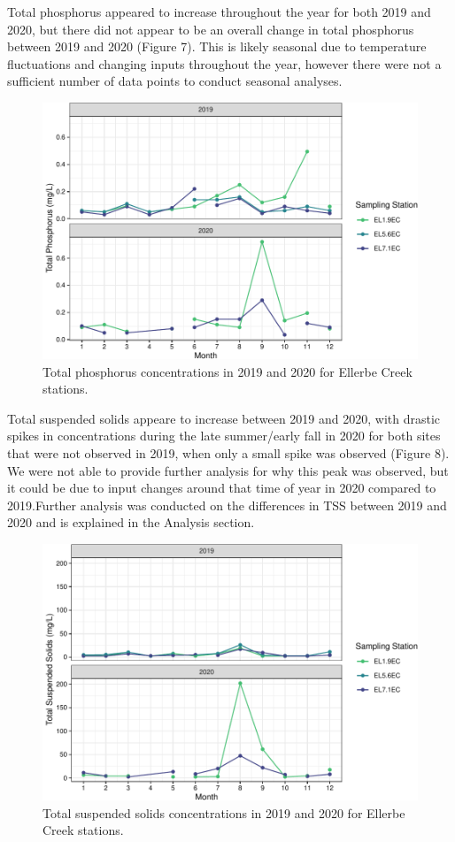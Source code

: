 \documentclass[
  12pt,
]{article}
\begin{document}
Total phosphorus appeared to increase throughout the year for both 2019
and 2020, but there did not appear to be an overall change in total
phosphorus between 2019 and 2020 (Figure 7). This is likely seasonal due
to temperature fluctuations and changing inputs throughout the year,
however there were not a sufficient number of data points to conduct
seasonal analyses.

\begin{figure}
\centering
\includegraphics{August_Lindborg_ENV872_Project_files/figure-latex/unnamed-chunk-19-1.pdf}
\caption{Total phosphorus concentrations in 2019 and 2020 for Ellerbe
Creek stations.}
\end{figure}

Total suspended solids appeare to increase between 2019 and 2020, with
drastic spikes in concentrations during the late summer/early fall in
2020 for both sites that were not observed in 2019, when only a small
spike was observed (Figure 8). We were not able to provide further
analysis for why this peak was observed, but it could be due to input
changes around that time of year in 2020 compared to 2019.Further
analysis was conducted on the differences in TSS between 2019 and 2020
and is explained in the Analysis section.

\begin{figure}
\centering
\includegraphics{August_Lindborg_ENV872_Project_files/figure-latex/unnamed-chunk-20-1.pdf}
\caption{Total suspended solids concentrations in 2019 and 2020 for
Ellerbe Creek stations.}
\end{figure}
\end{document}
